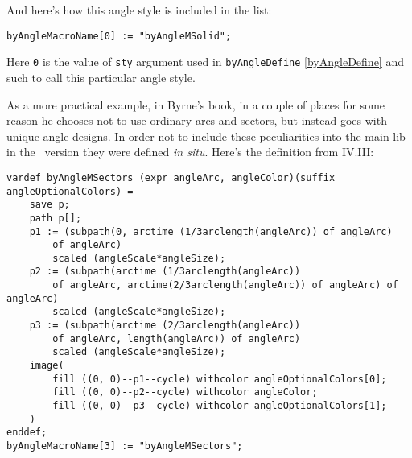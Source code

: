 	And here's how this angle style is included in the list:

\begin{lstlisting}
byAngleMacroName[0] := "byAngleMSolid";
\end{lstlisting}

	Here \texttt{0} is the value of \texttt{sty} argument used in \texttt{byAngleDefine} \ref{byAngleDefine} and such to call this particular angle style.
	
	As a more practical example, in Byrne's book, in a couple of places for some reason he chooses not to use ordinary arcs and sectors, but instead goes with unique angle designs. In order not to include these peculiarities into the main lib in the \ConTeXt\ version they were defined \textit{in situ}. Here's the definition from IV.III:

	
\begin{lstlisting}	
vardef byAngleMSectors (expr angleArc, angleColor)(suffix angleOptionalColors) =
    save p;
    path p[];
    p1 := (subpath(0, arctime (1/3arclength(angleArc)) of angleArc) 
    	of angleArc) 
    	scaled (angleScale*angleSize);
    p2 := (subpath(arctime (1/3arclength(angleArc)) 
    	of angleArc, arctime(2/3arclength(angleArc)) of angleArc) of angleArc) 
    	scaled (angleScale*angleSize);
    p3 := (subpath(arctime (2/3arclength(angleArc)) 
    	of angleArc, length(angleArc)) of angleArc) 
    	scaled (angleScale*angleSize);
    image(
        fill ((0, 0)--p1--cycle) withcolor angleOptionalColors[0];
        fill ((0, 0)--p2--cycle) withcolor angleColor;
        fill ((0, 0)--p3--cycle) withcolor angleOptionalColors[1];
    )
enddef;
byAngleMacroName[3] := "byAngleMSectors";
\end{lstlisting}

